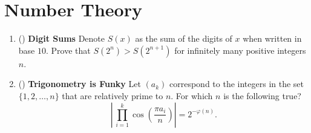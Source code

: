 \documentclass[11pt]{scrartcl}
\begin{document}
\newpage
\section{Number Theory}
\begin{enumerate}[label=\textbf{N\arabic*}.]
    \item (\fullchili) \textbf{Digit Sums} \newline
    Denote $S(x)$ as the sum of the digits of $x$ when written in base $10$. Prove that $S(2^n) > S(2^{n+1})$ for infinitely many positive integers $n$.

    \item (\fullchili) \textbf{Trigonometry is Funky} \newline
    Let $(a_k)$ correspond to the integers in the set $\{ 1, 2, \dots, n \}$ that are relatively prime to $n$. For which $n$ is the following true?
    \[ \left\lvert \, \prod_{i=1}^k \cos\left( \frac{\pi a_i}{n} \right) \right\rvert = 2^{-\varphi(n)}. \]
\end{enumerate}
\end{document}
